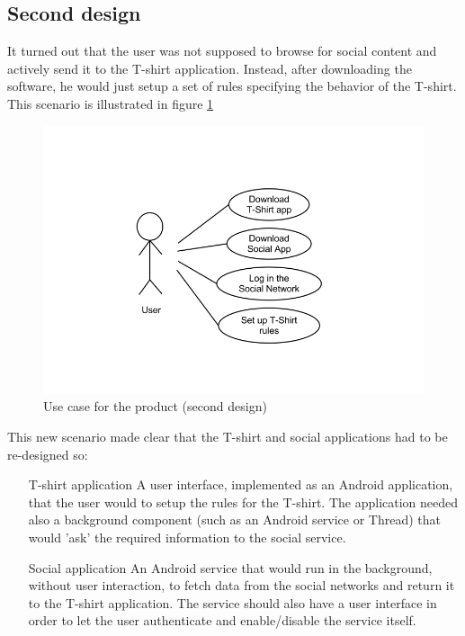 \subsection{Second design}
It turned out that the user was not supposed to browse for social content and actively send it 
to the T-shirt application. Instead, after downloading the software, he would just setup a set of rules
specifying the behavior of the T-shirt. This scenario is illustrated in figure \ref{fig:design-usecase2}

\begin{figure}[h!]
	\centering \includegraphics[scale=0.35]{img/design-usecase2}
	\caption{Use case for the product (second design)}
	\label{fig:design-usecase2}
\end{figure}

This new scenario made clear that the T-shirt and social applications had to be re-designed so:

\begin{itemize}

	\item [T-shirt application] A user interface, implemented as an Android application,
	that the user would to setup the rules for the T-shirt. The application needed also a
	background component (such as an Android service or Thread) that would 'ask' the required information
	to the social service.

	\item [Social application] An Android service that would run in the background, without user interaction,
	to fetch data from the social networks and return it to the T-shirt application.
	The service should also have a user interface in order to let the user authenticate and
	enable/disable the service itself.

	\end{itemize}


